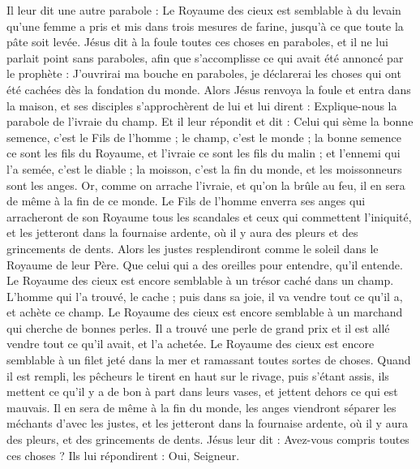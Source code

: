 \begin{multicols}{2}
\TextTitle{[4. Parabole du levain]
 (Lu. 13 : 20-21)]}
Il leur dit une autre parabole : Le Royaume des cieux est semblable à du levain qu'une femme a pris et mis dans trois mesures de farine, jusqu'à ce que toute la pâte soit levée.
Jésus dit à la foule toutes ces choses en paraboles, et il ne lui parlait point sans paraboles,
afin que s’accomplisse ce qui avait été annoncé par le prophète : J'ouvrirai ma bouche en paraboles, je déclarerai les choses qui ont été cachées dès la fondation du monde.
Alors Jésus renvoya la foule et entra dans la maison, et ses disciples s’approchèrent de lui et lui dirent : Explique-nous la parabole de l'ivraie du champ.
Et il leur répondit et dit : Celui qui sème la bonne semence, c'est le Fils de l'homme ;
le champ, c'est le monde ; la bonne semence ce sont les fils du Royaume, et l'ivraie ce sont les fils du malin ;
et l'ennemi qui l'a semée, c'est le diable ; la moisson, c'est la fin du monde, et les moissonneurs sont les anges.
Or, comme on arrache l'ivraie, et qu’on la brûle au feu, il en sera de même à la fin de ce monde.
Le Fils de l'homme enverra ses anges qui arracheront de son Royaume tous les scandales et ceux qui commettent l'iniquité,
et les jetteront dans la fournaise ardente, où il y aura des pleurs et des grincements de dents.
Alors les justes resplendiront comme le soleil dans le Royaume de leur Père. Que celui qui a des oreilles pour entendre, qu'il entende.
Le Royaume des cieux est encore semblable à un trésor caché dans un champ. L’homme qui l’a trouvé, le cache ; puis dans sa joie, il va vendre tout ce qu'il a, et achète ce champ.
Le Royaume des cieux est encore semblable à un marchand qui cherche de bonnes perles.
Il a trouvé une perle de grand prix et il est allé vendre tout ce qu'il avait, et l'a achetée.
Le Royaume des cieux est encore semblable à un filet jeté dans la mer et ramassant toutes sortes de choses.
Quand il est rempli, les pêcheurs le tirent en haut sur le rivage, puis s'étant assis, ils mettent ce qu'il y a de bon à part dans leurs vases, et jettent dehors ce qui est mauvais.
Il en sera de même à la fin du monde, les anges viendront séparer les méchants d'avec les justes,
et les jetteront dans la fournaise ardente, où il y aura des pleurs, et des grincements de dents.
Jésus leur dit : Avez-vous compris toutes ces choses ? Ils lui répondirent : Oui, Seigneur.

\end{multicols}
